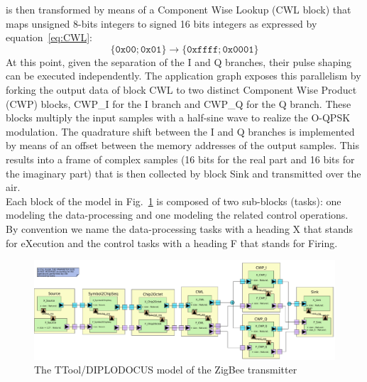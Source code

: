 \documentclass{llncs}
\begin{document}
is then transformed by means of a Component Wise Lookup (CWL block) that maps unsigned 8-bits integers to signed 16 bits
integers as expressed by equation~\ref{eq:CWL}:
%
\begin{equation}
\label{eq:CWL}
\{\texttt{0x00}; \texttt{0x01}\} \rightarrow \{\texttt{0xffff}; \texttt{0x0001}\}
\end{equation}
%
At this point, given the separation of the I and Q branches, their pulse shaping can be executed independently. The
application graph exposes this parallelism by forking the output data of block CWL to two distinct Component Wise
Product (CWP) blocks, CWP\_I for the I branch and CWP\_Q for the Q branch. These blocks multiply the input samples with
a half-sine wave to realize the O-QPSK modulation. The quadrature shift between the I and Q branches is implemented by
means of an offset between the memory addresses of the output samples. This
results into a frame of complex samples (16 bits for the real part and 16 bits for the imaginary part) that is then collected by block Sink and transmitted over the
air.\\
%
Each block of the model in Fig.~\ref{fig:ZigBeeTX} is composed of two sub-blocks (tasks): one modeling the
data-processing and one modeling the related control operations. By convention
we name the data-processing tasks with a heading X that stands for eXecution and the control tasks with a heading F that stands for Firing.
%
\begin{figure}[!htbp]
	\centering
	\includegraphics[width=\textwidth]{figures/ZigbeeApp.pdf}
	\caption{The TTool/DIPLODOCUS model of the ZigBee transmitter}
	\label{fig:ZigBeeTX}
\end{figure}
%
\end{document}

